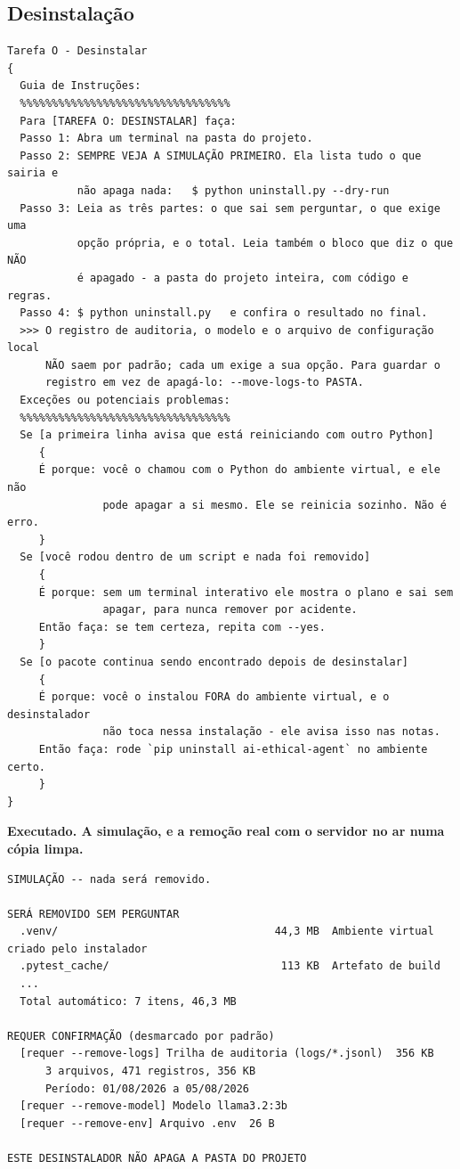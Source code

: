 \documentclass[10pt]{article}
\begin{document}
\subsection{Desinstalação}

\begin{lstlisting}
Tarefa O - Desinstalar
{
  Guia de Instruções:
  %%%%%%%%%%%%%%%%%%%%%%%%%%%%%%%%%
  Para [TAREFA O: DESINSTALAR] faça:
  Passo 1: Abra um terminal na pasta do projeto.
  Passo 2: SEMPRE VEJA A SIMULAÇÃO PRIMEIRO. Ela lista tudo o que sairia e
           não apaga nada:   $ python uninstall.py --dry-run
  Passo 3: Leia as três partes: o que sai sem perguntar, o que exige uma
           opção própria, e o total. Leia também o bloco que diz o que NÃO
           é apagado - a pasta do projeto inteira, com código e regras.
  Passo 4: $ python uninstall.py   e confira o resultado no final.
  >>> O registro de auditoria, o modelo e o arquivo de configuração local
      NÃO saem por padrão; cada um exige a sua opção. Para guardar o
      registro em vez de apagá-lo: --move-logs-to PASTA.
  Exceções ou potenciais problemas:
  %%%%%%%%%%%%%%%%%%%%%%%%%%%%%%%%%
  Se [a primeira linha avisa que está reiniciando com outro Python]
     {
     É porque: você o chamou com o Python do ambiente virtual, e ele não
               pode apagar a si mesmo. Ele se reinicia sozinho. Não é erro.
     }
  Se [você rodou dentro de um script e nada foi removido]
     {
     É porque: sem um terminal interativo ele mostra o plano e sai sem
               apagar, para nunca remover por acidente.
     Então faça: se tem certeza, repita com --yes.
     }
  Se [o pacote continua sendo encontrado depois de desinstalar]
     {
     É porque: você o instalou FORA do ambiente virtual, e o desinstalador
               não toca nessa instalação - ele avisa isso nas notas.
     Então faça: rode `pip uninstall ai-ethical-agent` no ambiente certo.
     }
}
\end{lstlisting}

\textbf{Executado. A simulação, e a remoção real com o servidor no ar numa cópia limpa.}

\begin{lstlisting}
SIMULAÇÃO -- nada será removido.

SERÁ REMOVIDO SEM PERGUNTAR
  .venv/                                  44,3 MB  Ambiente virtual criado pelo instalador
  .pytest_cache/                           113 KB  Artefato de build
  ...
  Total automático: 7 itens, 46,3 MB

REQUER CONFIRMAÇÃO (desmarcado por padrão)
  [requer --remove-logs] Trilha de auditoria (logs/*.jsonl)  356 KB
      3 arquivos, 471 registros, 356 KB
      Período: 01/08/2026 a 05/08/2026
  [requer --remove-model] Modelo llama3.2:3b
  [requer --remove-env] Arquivo .env  26 B

ESTE DESINSTALADOR NÃO APAGA A PASTA DO PROJETO
\end{lstlisting}
\end{document}
